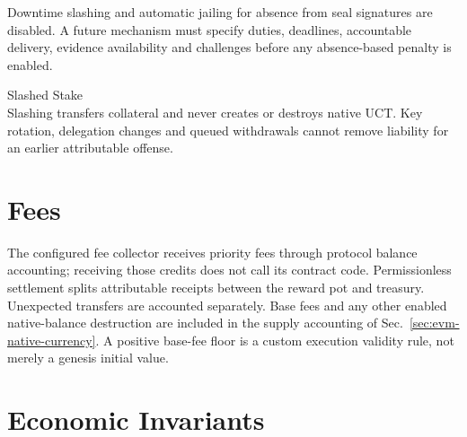Downtime slashing and automatic jailing for absence from seal signatures are disabled. A future mechanism must specify duties, deadlines, accountable delivery, evidence availability and challenges before any absence-based penalty is enabled.

\begin{ruledef*}{Slashed Stake} \\
 Slashing transfers collateral and never creates or destroys native UCT. Key rotation, delegation changes and queued withdrawals cannot remove liability for an earlier attributable offense.
\end{ruledef*}

\section{Fees}\label{sec:gov-fees}

The configured fee collector receives priority fees through protocol balance accounting; receiving those credits does not call its contract code. Permissionless settlement splits attributable receipts between the reward pot and treasury. Unexpected transfers are accounted separately. Base fees and any other enabled native-balance destruction are included in the supply accounting of Sec.~\ref{sec:evm-native-currency}. A positive base-fee floor is a custom execution validity rule, not merely a genesis initial value.

\section{Economic Invariants}\label{sec:gov-invariants}

